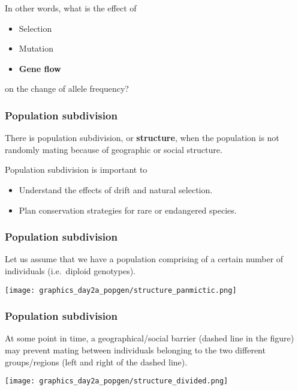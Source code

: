 \documentclass{beamer}
\newcommand{\1}{\ensuremath{\mathbf{1}}}
\begin{document}
%
%
%
\begin{frame}
	In other words, what is the effect of
	\begin{itemize}
		\item Selection
		\item Mutation
		\item \textbf{Gene flow}
	\end{itemize}
	on the change of allele frequency?
\end{frame}
%
%
%
\begin{frame}\frametitle{Population subdivision}
	\begin{block}{}
		There is population subdivision, or \textbf{structure}, when the population is not randomly mating because of geographic or social structure.
	\end{block}
	\vspace{1.5ex}
	Population subdivision is important to
	\begin{itemize}
		\item Understand the effects of drift and natural selection.
		\item Plan conservation strategies for rare or endangered species.
	\end{itemize}
\end{frame}
%
%
%
\begin{frame}\frametitle{Population subdivision}
	Let us assume that we have a population comprising of a certain number of individuals (i.e.\ diploid genotypes).
	\begin{center}
		\texttt{[image: graphics\_day2a\_popgen/structure\_panmictic.png]}
	\end{center}
\end{frame}
%
%
%
\begin{frame}\frametitle{Population subdivision}
	At some point in time, a geographical/social barrier (dashed line in the figure) may prevent mating between individuals belonging to the two different groups/regions (left and right of the dashed line).
	\begin{center}
		\texttt{[image: graphics\_day2a\_popgen/structure\_divided.png]}
	\end{center}
\end{frame}
\end{document}
